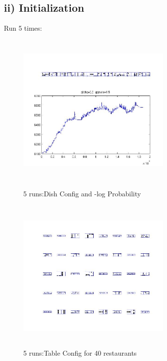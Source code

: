 \documentclass{article}
\begin{document}
\begin{spacing}{1.1}
\subsection{ii) Initialization}
Run 5 times:
\begin{figure}[h] 
  \begin{minipage}[b]{0.5\textwidth} 
    \centering 
    \includegraphics[width=3in,height=3in]{init1_5.jpg} 
    \caption{5 runs:Dish Config and -log Probability}
    \label{fig:by:table} 
  \end{minipage}%
  \begin{minipage}[b]{0.5\textwidth} 
    \centering 
    \includegraphics[width=3in,height=3in]{init1_5d.jpg} 
    \caption{5 runs:Table Config for 40 restaurants}
    \label{fig:by:table}  
   \end{minipage}%
\end{figure}


\end{spacing}
\end{document}
